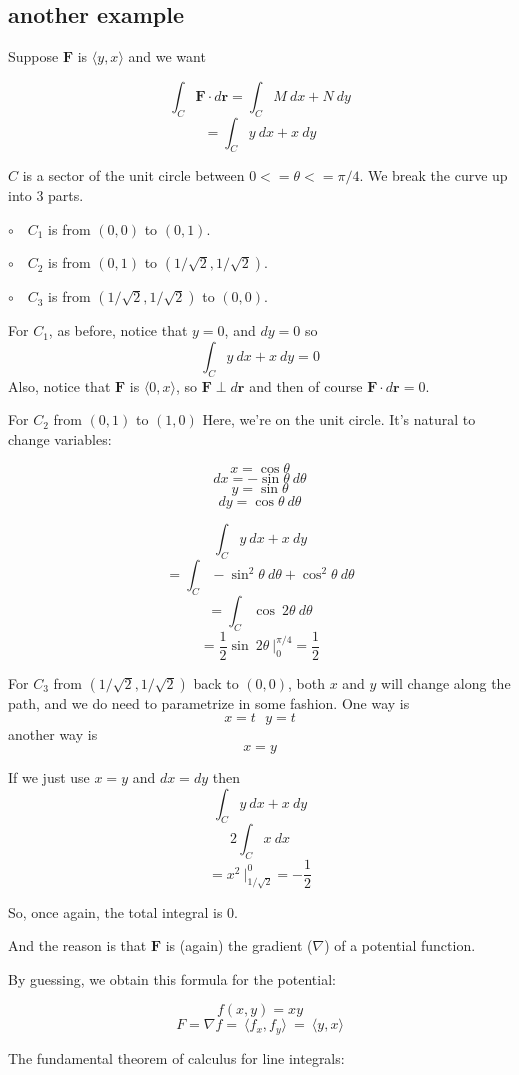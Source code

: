 \documentclass[11pt, oneside]{article}   	%
\begin{document}
\subsection*{another example}
Suppose $\mathbf{F}$ is $\langle y,x \rangle $ and we want

\[ \int_C \mathbf{F} \cdot  d \mathbf{r} = \int_C M \ dx + N \ dy \]
\[ = \int_C y \ dx + x \ dy \]

$C$ is a sector of the unit circle between $0 <= \theta <= \pi/4$.  We break the curve up into 3 parts.

$\circ \ \ \ $ $C_1$ is from $(0,0)$ to $(0,1)$.  

$\circ \ \ \ $ $C_2$ is from $(0,1)$ to $(1/\sqrt{2},1/\sqrt{2})$. 

$\circ \ \ \ $ $C_3$ is from $(1/\sqrt{2},1/\sqrt{2})$ to $(0,0)$.  

For $C_1$, as before, notice that $y=0$, and $dy=0$ so 
\[ \int_C y \ dx + x \ dy = 0 \]
Also, notice that $\mathbf{F}$ is $\langle 0,x \rangle$, so $\mathbf{F} \perp d\mathbf{r}$ and then of course $\mathbf{F} \cdot d\mathbf{r} = 0$.

For $C_2$ from $(0,1)$ to $(1,0)$  Here, we're on the unit circle.  It's natural to change variables:

\[ x = \cos \theta \]
\[ dx = -\sin \theta \ d \theta \]
\[ y = \sin \theta \]
\[ dy = \cos \theta \ d \theta \]

\[ \int_C y \ dx + x \ dy  \]
\[ = \int_C -\sin^2 \theta \ d \theta + \cos^2 \theta \ d \theta \]
\[ = \int_C \cos \ 2 \theta \ d \theta \]
\[ = \frac{1}{2} \sin \ 2 \theta \ \bigg|_0^{\pi/4} = \frac{1}{2} \]

For $C_3$ from $(1/\sqrt{2},1/\sqrt{2})$ back to $(0,0)$, both $x$ and $y$ will change along the path, and we do need to parametrize in some fashion.  One way is
\[ x = t \ \ \ y = t \]
another way is
\[ x = y \]

If we just use $x=y$ and $dx=dy$ then
\[ \int_C y \ dx + x \ dy  \]
\[ 2 \int_C x \ dx \]
\[ = x^2  \ \bigg|_{1/\sqrt{2}}^0 = - \frac{1}{2} \]

So, once again, the total integral is $0$.

And the reason is that $\mathbf{F}$ is (again) the gradient ($\nabla$) of a potential function.  

By guessing, we obtain this formula for the potential:

\[ f(x,y) = xy \]
\[ F = \nabla f = \ \langle f_x,f_y \rangle \ = \ \langle y,x \rangle \]

The fundamental theorem of calculus for line integrals:
\end{document}
